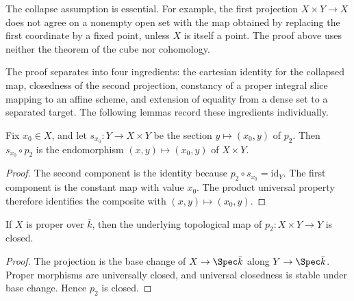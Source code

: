 \begin{remark}
  \label{rmk:rigidity_lemma_cube_free}
  The collapse assumption is essential.  For example, the first projection
  \(X\times Y\to X\) does not agree on a nonempty open set with the map obtained by
  replacing the first coordinate by a fixed point, unless \(X\) is itself a point.
  The proof above uses neither the theorem of the cube nor cohomology.
\end{remark}

\begin{remark}
  \label{rmk:rigidity_lemma_decomposition}
  The proof separates into four ingredients: the cartesian identity for the collapsed
  map, closedness of the second projection, constancy of a proper integral slice mapping
  to an affine scheme, and extension of equality from a dense set to a separated target.
  The following lemmas record these ingredients individually.
\end{remark}

\begin{lemma}
  \label{lem:rigidity_snd_lift}
  \leanok
  Fix \(x_0\in X\), and let \(s_{x_0}\colon Y\to X\times Y\) be the section
  \(y\mapsto(x_0,y)\) of \(p_2\).  Then \(s_{x_0}\circ p_2\) is the endomorphism
  \((x,y)\mapsto(x_0,y)\) of \(X\times Y\).
\end{lemma}
\begin{proof}
  \leanok
  The second component is the identity because \(p_2\circ s_{x_0}=\mathrm{id}_Y\).
  The first component is the constant map with value \(x_0\).  The product universal
  property therefore identifies the composite with \((x,y)\mapsto(x_0,y)\).
\end{proof}

\begin{lemma}
  \label{lem:snd_left_isClosedMap}
  \leanok
  If \(X\) is proper over \(\bar k\), then the underlying topological map of
  \(p_2\colon X\times Y\to Y\) is closed.
\end{lemma}
\begin{proof}
  \leanok
  The projection is the base change of \(X\to\Spec\bar k\) along
  \(Y\to\Spec\bar k\).  Proper morphisms are universally closed, and universal
  closedness is stable under base change.  Hence \(p_2\) is closed.
\end{proof}

